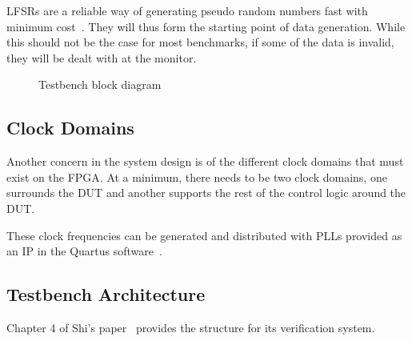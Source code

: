 LFSRs are a reliable way of generating pseudo random numbers fast with minimum
cost~\cite{Hazwani1}.
They will thus form the starting point of data generation.
While this should not be the case for most benchmarks, if some of the data is
invalid, they will be dealt with at the monitor.

\begin{figure}[H]
  \centering
  
  \caption{Testbench block diagram}
  \label{Block}
\end{figure}

\subsection{Clock Domains}
Another concern in the system design is of the different clock domains that
must exist on the FPGA.
At a minimum, there needs to be two clock domains, one surrounds the DUT and
another supports the rest of the control logic around the DUT.

These clock frequencies can be generated and distributed with PLLs provided as
an IP in the Quartus software~\cite{Altera4}.

\subsection{Testbench Architecture}

Chapter 4 of Shi's paper~\cite{Shi1} provides the structure for its
verification system.